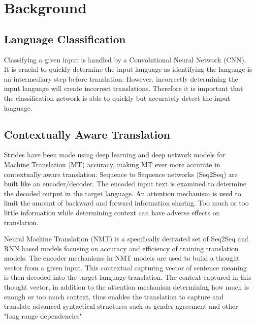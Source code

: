 \documentclass[10pt,a4paper]{report}
\begin{document}
\clearpage

\section{Background}

\subsection{Language Classification}

  Classifying a given input is handled by a Convolutional Neural Network (CNN). It is crucial to quickly determine the input language as identifying the language is an intermediary step before translation. However, incorrectly determining the input language will create incorrect translations. Therefore it is important that the classification network is able to quickly but accurately detect the input language.

\subsection{Contextually Aware Translation}

  Strides have been made using deep learning and deep network models for Machine Translation (MT) accuracy, making MT ever more accurate in contextually aware translation. Sequence to Sequence networks (Seq2Seq) are built like an encoder/decoder. The encoded input text is examined to determine the decoded output in the target language. An attention mechanism is used to limit the amount of backward and forward information sharing. Too much or too little information while determining context can have adverse effects on translation. 

  Neural Machine Translation (NMT) is a specifically derivated set of Seq2Seq and RNN based models focusing on accuracy and efficiency of training translation models. The encoder mechanisms in NMT models are used to build a thought vector from a given input. This contextual capturing vector of sentence meaning is then decoded into the target language translation. The context captured in this thought vector, in addition to the attention mechanism determining how much is enough or too much context, thus enables the translation to capture and translate advanced syntactical structures such as gender agreement and other "long range dependencies"

\clearpage
\end{document}

